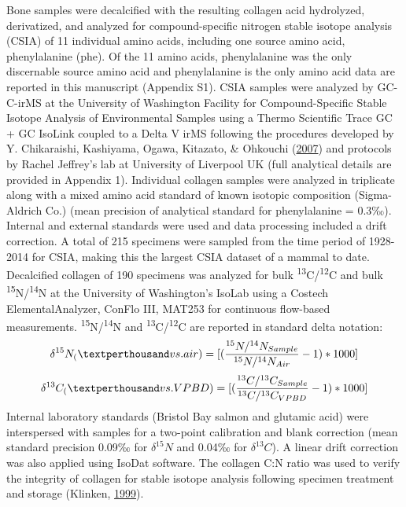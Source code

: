 \documentclass [11pt, proquest] {uwthesis}[2015/03/03]
\begin{document}
Bone samples were decalcified with the resulting collagen acid
hydrolyzed, derivatized, and analyzed for compound-specific nitrogen
stable isotope analysis (CSIA) of 11 individual amino acids, including
one source amino acid, phenylalanine (phe). Of the 11 amino acids,
phenylalanine was the only discernable source amino acid and
phenylalanine is the only amino acid data are reported in this
manuscript (Appendix S1). CSIA samples were analyzed by GC-C-irMS at the
University of Washington Facility for Compound-Specific Stable Isotope
Analysis of Environmental Samples using a Thermo Scientific Trace GC +
GC IsoLink coupled to a Delta V irMS following the procedures developed
by Y. Chikaraishi, Kashiyama, Ogawa, Kitazato, \& Ohkouchi
(\protect\hyperlink{ref-Chikaraishi2007}{2007}) and protocols by Rachel
Jeffrey's lab at University of Liverpool UK (full analytical details are
provided in Appendix 1). Individual collagen samples were analyzed in
triplicate along with a mixed amino acid standard of known isotopic
composition (Sigma-Aldrich Co.) (mean precision of analytical standard
for phenylalanine = 0.3‰). Internal and external standards were used and
data processing included a drift correction. A total of 215 specimens
were sampled from the time period of 1928-2014 for CSIA, making this the
largest CSIA dataset of a mammal to date. Decalcified collagen of 190
specimens was analyzed for bulk
\textsuperscript{13}C/\textsuperscript{12}C and bulk
\textsuperscript{15}N/\textsuperscript{14}N at the University of
Washington's IsoLab using a Costech ElementalAnalyzer, ConFlo III,
MAT253 for continuous flow-based measurements.
\textsuperscript{15}N/\textsuperscript{14}N and
\textsuperscript{13}C/\textsuperscript{12}C are reported in standard
delta notation:
\begin{equation} 
  \delta^{15}N_ ( \textperthousand vs. air) =   
  [(\frac{^{15}N/^{14}N_{Sample}}{^{15}N/^{14}N_{Air}} -1)*1000]
  \label{eq:deltN}
\end{equation}
\begin{equation} 
  \delta^{13}C_ ( \textperthousand vs. VPBD) =   
  [(\frac{^{13}C/^{13}C_{Sample}}{^{13}C/^{13}C_{VPBD}} -1)*1000]
  \label{eq:deltC}
\end{equation}
Internal laboratory standards (Bristol Bay salmon and glutamic acid)
were interspersed with samples for a two-point calibration and blank
correction (mean standard precision 0.09‰ for \(\delta^{15}N\) and 0.04‰
for \(\delta^{13}C\)). A linear drift correction was also applied using
IsoDat software. The collagen C:N ratio was used to verify the integrity
of collagen for stable isotope analysis following specimen treatment and
storage (Klinken, \protect\hyperlink{ref-vanKlinken1999}{1999}).
\end{document}
